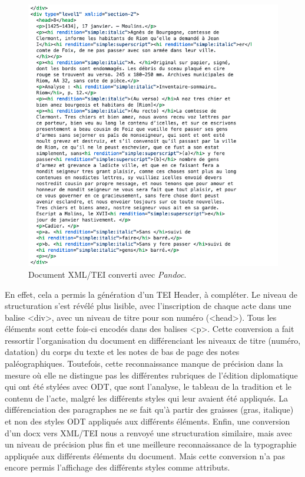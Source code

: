 \begin{figure}[H]
    \centering
    \includegraphics[scale=0.6]{front/images/pandoc_tei.png}
    \caption{Document XML/TEI converti avec \textit{Pandoc}.}
    \label{fig:pandoc_tei}
\end{figure}

\newpage 

\par En effet, cela a permis la génération d’un TEI Header, à compléter. Le niveau de structuration s’est révélé plus lisible, avec l’inscription de chaque acte dans une balise <div>, avec un niveau de titre pour son numéro (<head>). Tous les éléments sont cette fois-ci encodés dans des balises <p>. Cette conversion a fait ressortir l’organisation du document en différenciant les niveaux de titre (numéro, datation) du corps du texte et les notes de bas de page des notes paléographiques. Toutefois, cette reconnaissance manque de précision dans la mesure où elle ne distingue pas les différentes rubriques de l'édition diplomatique qui ont été stylées avec ODT, que sont l’analyse, le tableau de la tradition et le contenu de l’acte, malgré les différents styles qui leur avaient été appliqués. La différenciation des paragraphes ne se fait qu’à partir des graisses (gras, italique) et non des styles ODT appliqués aux différents éléments. Enfin, une conversion d’un docx vers XML/TEI nous a renvoyé une structuration similaire, mais avec un niveau de précision plus fin et une meilleure reconnaissance de la typographie appliquée aux différents éléments du document. Mais cette conversion n’a pas encore permis l’affichage des différents styles comme attributs. 
\newline 


